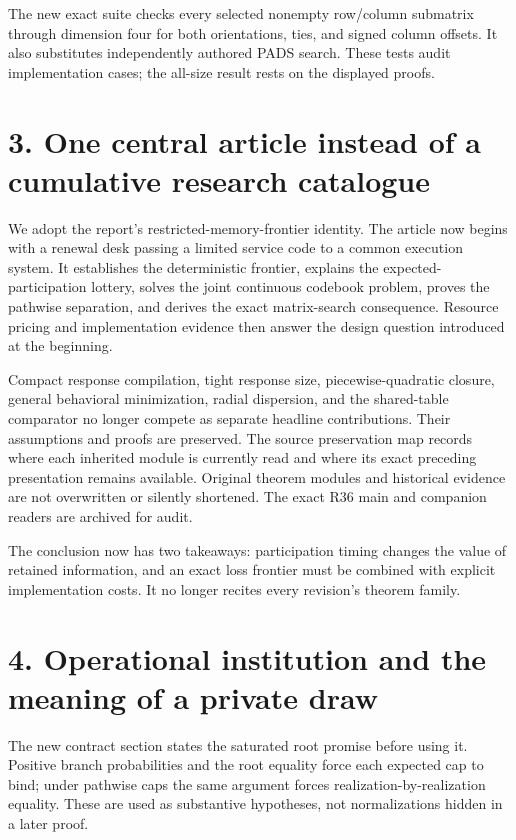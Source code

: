\documentclass[11pt,letterpaper]{article}
\theoremstyle{definition}\newtheorem{assumption}[theorem]{Assumption}
\begin{document}
The new exact suite checks every selected nonempty row/column submatrix through dimension four for both orientations, ties, and signed column offsets. It also substitutes independently authored PADS search. These tests audit implementation cases; the all-size result rests on the displayed proofs.

\section*{3. One central article instead of a cumulative research catalogue}

We adopt the report's restricted-memory-frontier identity. The article now begins with a renewal desk passing a limited service code to a common execution system. It establishes the deterministic frontier, explains the expected-participation lottery, solves the joint continuous codebook problem, proves the pathwise separation, and derives the exact matrix-search consequence. Resource pricing and implementation evidence then answer the design question introduced at the beginning.

Compact response compilation, tight response size, piecewise-quadratic closure, general behavioral minimization, radial dispersion, and the shared-table comparator no longer compete as separate headline contributions. Their assumptions and proofs are preserved. The source preservation map records where each inherited module is currently read and where its exact preceding presentation remains available. Original theorem modules and historical evidence are not overwritten or silently shortened. The exact R36 main and companion readers are archived for audit.

The conclusion now has two takeaways: participation timing changes the value of retained information, and an exact loss frontier must be combined with explicit implementation costs. It no longer recites every revision's theorem family.

\section*{4. Operational institution and the meaning of a private draw}

The new contract section states the saturated root promise before using it. Positive branch probabilities and the root equality force each expected cap to bind; under pathwise caps the same argument forces realization-by-realization equality. These are used as substantive hypotheses, not normalizations hidden in a later proof.
\end{document}
